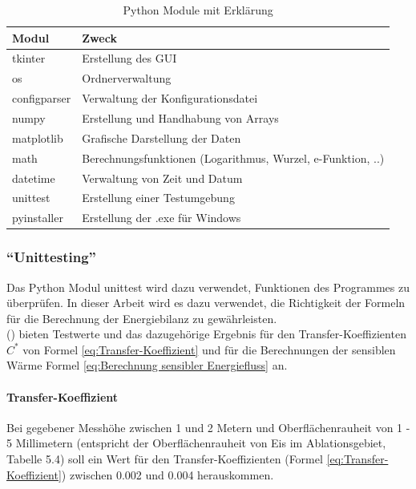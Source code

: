 \documentclass[11pt,a4paper]{article}
\begin{document}
\begin{table}[H]
\centering
{} 
\caption{Python Module mit Erklärung}
\label{tab:Python Module}
\begin{tabular}{|l|l|}
\hline
\textbf{Modul} & \textbf{Zweck}                                \\ \hline
tkinter             & Erstellung des GUI         \\
os             & Ordnerverwaltung         \\
configparser             & Verwaltung der Konfigurationsdatei         \\
numpy          & Erstellung und Handhabung von Arrays          \\
matplotlib     & Grafische Darstellung der Daten               \\
math		   & Berechnungsfunktionen (Logarithmus, Wurzel, e-Funktion, ..)   \\  
datetime		   & Verwaltung von Zeit und Datum   \\
unittest		   & Erstellung einer Testumgebung   \\  
pyinstaller		   & Erstellung der .exe für Windows   \\ \hline


\end{tabular}
\end{table}
\vspace{0.3cm}

\subsubsection{``Unittesting''}
Das Python Modul unittest wird dazu verwendet, Funktionen des Programmes zu überprüfen. In dieser Arbeit wird es dazu verwendet, die Richtigkeit der Formeln für die Berechnung der Energiebilanz zu gewährleisten.\\

\citeauthor{ThePhysicsOfGlaciers} (\citeyear[157]{ThePhysicsOfGlaciers}) bieten Testwerte und das dazugehörige Ergebnis für den Transfer-Koeffizienten $C^*$ von Formel \ref{eq:Transfer-Koeffizient} und für die Berechnungen der sensiblen Wärme Formel \ref{eq:Berechnung sensibler Energiefluss} an.


\paragraph{Transfer-Koeffizient}

Bei gegebener Messhöhe zwischen 1 und 2 Metern und Oberflächenrauheit von  1 - 5 Millimetern (entspricht der Oberflächenrauheit von Eis im Ablationsgebiet, Tabelle 5.4) soll ein Wert für den Transfer-Koeffizienten (Formel \ref{eq:Transfer-Koeffizient}) zwischen 0.002 und 0.004 herauskommen.\\
\end{document}

